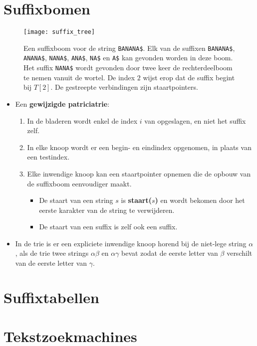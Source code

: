 \section{Suffixbomen}
\begin{figure}[ht]
    \centering
    \texttt{[image: suffix\_tree]}
    \caption{Een suffixboom voor de string \texttt{BANANA\$}. Elk van de suffixen \texttt{BANANA\$}, \texttt{ANANA\$}, \texttt{NANA\$}, \texttt{ANA\$}, \texttt{NA\$} en \texttt{A\$} kan gevonden worden in deze boom. Het suffix \texttt{NANA\$} wordt gevonden door twee keer de rechterdeelboom te nemen vanuit de wortel. De index $2$ wijst erop dat de suffix begint bij $T[2]$. De gestreepte verbindingen zijn staartpointers.}
    \label{fig:suffix_tree}
\end{figure}
\begin{itemize}
    \item Een \textbf{gewijzigde patriciatrie}:
    \begin{enumerate}
        \item In de bladeren wordt enkel de index $i$ van  opgeslagen, en niet het suffix zelf.
        \item In elke knoop wordt er een begin- en eindindex opgenomen, in plaats van een testindex.
        \item Elke inwendige knoop kan een staartpointer opnemen die de opbouw van de suffixboom eenvoudiger maakt.
        \begin{itemize}
            \item De staart van een string $s$ is \textbf{staart($s$)} en wordt bekomen door het eerste karakter van de string te verwijderen.
            \item De staart van een suffix is zelf ook een suffix.
        \end{itemize}
    \end{enumerate}
    \item In de trie is er een expliciete inwendige knoop horend bij de niet-lege string $\alpha$, als de trie twee strings $\alpha\beta$ en $\alpha\gamma$ bevat zodat de eerste letter van $\beta$ verschilt van de eerste letter van $\gamma$.
\end{itemize}

\section{Suffixtabellen}

\section{Tekstzoekmachines}

